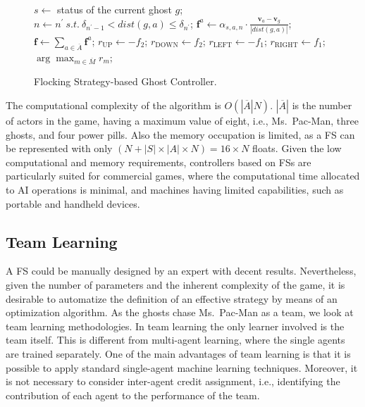 \documentclass[journal]{IEEEtran}
\begin{document}
\begin{figure}[!t]
\begin{algorithmic}
\STATE $s\gets$ status of the current ghost $g$;
	\STATE $n\gets n^\prime \ s.t.\ \delta_{n^\prime-1} < dist(g,a) \leq \delta_{n^\prime}$; 
	\STATE $\mathbf{f}^a \gets \alpha_{s,a,n} \cdot \frac{\mathbf{v}_a - \mathbf{v}_g}{|dist(g,a)|}$; 
\ENDFOR
\STATE $\mathbf{f} \gets \sum_{a \in \overline{A}} \mathbf{f}^a$; 
\STATE {}
\STATE $r_\text{UP} \gets - f_2$;
\STATE $r_\text{DOWN} \gets f_2$;
\STATE $r_\text{LEFT} \gets - f_1$;
\STATE $r_\text{RIGHT} \gets f_1$;
\RETURN $\arg\max_{m \in \overline{M}} r_m$; 
\end{algorithmic}
\caption{Flocking Strategy-based Ghost Controller.}
\label{alg:FS_Controller} 
\end{figure}

The computational complexity of the algorithm is $O(|\overline{A}|N)$. $|\overline{A}|$ is the number of actors in the game, having a maximum value of eight, i.e., Ms.\  Pac-Man, three ghosts, and four power pills. Also the memory occupation is limited, as a FS can be represented with only $(N + |S| \times |A| \times N) = 16 \times N$ floats. Given the low computational and memory requirements, controllers based on FSs are particularly suited for commercial games, where the computational time allocated to AI operations is minimal, and machines having limited capabilities, such as portable and handheld devices.

\subsection{Team Learning}
A FS could be manually designed by an expert with decent results. Nevertheless, given the number of parameters and the inherent complexity of the game, it is desirable to automatize the definition of an effective strategy by means of an optimization algorithm. As the ghosts chase Ms.\  Pac-Man as a team, we look at team learning methodologies. In team learning \cite{Panait2005} the only learner involved is the team itself. This is different from multi-agent learning, where the single agents are trained separately. One of the main advantages of team learning is that it is possible to apply standard single-agent machine learning techniques. Moreover, it is not necessary to consider inter-agent credit assignment, i.e., identifying the contribution of each agent to the performance of the team.
\end{document}
